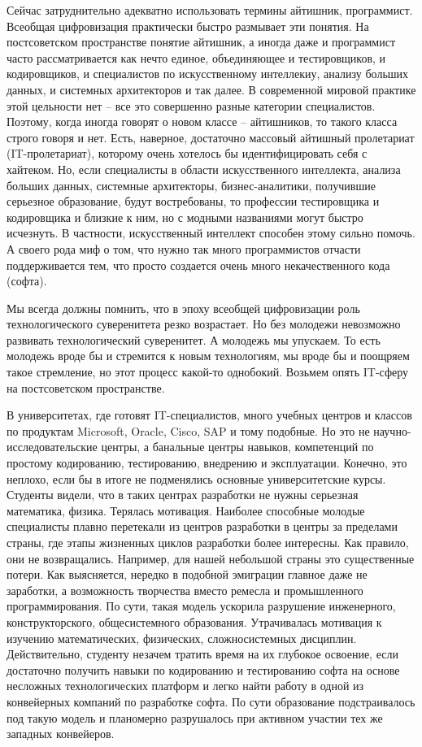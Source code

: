 \begin{partbacktext}
Сейчас затруднительно адекватно использовать термины айтишник, программист. Всеобщая цифровизация практически быстро размывает эти понятия. На постсоветском пространстве понятие айтишник, а иногда даже и программист часто рассматривается как нечто единое, объединяющее и тестировщиков, и кодировщиков, и специалистов по искусственному интеллекиу, анализу больших данных, и системных архитекторов и так далее. В современной мировой практике этой цельности нет -- все это совершенно разные категории специалистов. Поэтому, когда иногда говорят о новом классе -- айтишников, то такого класса строго говоря и нет. Есть, наверное, достаточно массовый айтишный пролетариат (IT-пролетариат), которому очень хотелось бы идентифицировать себя с хайтеком. Но, если специалисты в области искусственного интеллекта, анализа больших данных, системные архитекторы, бизнес-аналитики, получившие серьезное образование, будут востребованы, то профессии тестировщика и кодировщика и близкие к ним, но с модными названиями могут быстро исчезнуть. В частности, искусственный интеллект способен этому сильно помочь. А своего рода миф о том, что нужно так много программистов отчасти поддерживается тем, что просто создается очень много некачественного кода (софта).

Мы всегда должны помнить, что в эпоху всеобщей цифровизации роль технологического суверенитета резко возрастает. Но без молодежи невозможно развивать технологический суверенитет. А молодежь мы упускаем. То есть молодежь вроде бы и стремится к новым технологиям, мы вроде бы и поощряем такое стремление, но этот процесс какой-то однобокий. Возьмем опять IT-сферу на постсоветском пространстве.

В университетах, где готовят IT-специалистов, много учебных центров и классов по продуктам Microsoft, Oracle, Cisco, SAP и тому подобные. Но это не научно-исследовательские центры, а банальные центры навыков, компетенций по простому кодированию, тестированию, внедрению и эксплуатации. Конечно, это неплохо, если бы в итоге не подменялись основные университетские курсы. Студенты видели, что в таких центрах разработки не нужны серьезная математика, физика. Терялась мотивация. Наиболее способные молодые специалисты плавно перетекали из центров разработки в центры за пределами страны, где этапы жизненных циклов разработки более интересны. Как правило, они не возвращались. Например, для нашей небольшой страны это существенные потери. Как выясняется, нередко в подобной эмиграции главное даже не заработки, а возможность творчества вместо ремесла и промышленного программирования. По сути, такая модель ускорила разрушение инженерного, конструкторского, общесистемного образования. Утрачивалась мотивация к изучению математических, физических, сложносистемных дисциплин. Действительно, студенту незачем тратить время на их глубокое освоение, если достаточно получить навыки по кодированию и тестированию софта на основе несложных технологических платформ и легко найти работу в одной из конвейерных компаний по разработке софта. По сути образование подстраивалось под такую модель и планомерно разрушалось при активном участии тех же западных конвейеров.


\end{partbacktext}
